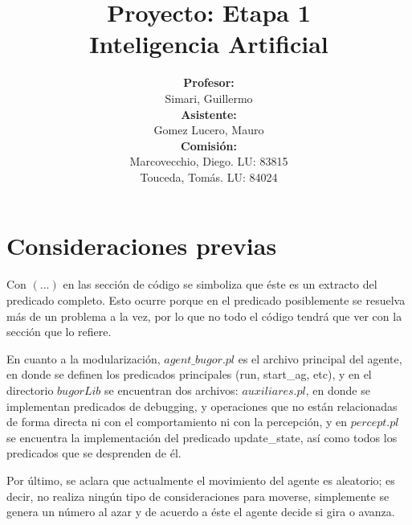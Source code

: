 \documentclass[a4paper,10pt,spanish]{article}
\begin{document}
\begin{titlepage}

\title{{\bf Proyecto: Etapa 1}\\ Inteligencia Artificial\vspace{10mm}}
\author{{\bf Profesor:}\\ Simari, Guillermo\\
{\bf Asistente:}\\ Gomez Lucero, Mauro\\
{\bf Comisi\'on:}\\ Marcovecchio, Diego. LU: 83815\\ Touceda, Tom\'as. LU: 84024}
\date{}

\maketitle

\thispagestyle{empty}

\end{titlepage}

\newpage

\tableofcontents

\newpage

\section{Consideraciones previas}

	Con $(...)$ en las secci\'on de c\'odigo se simboliza que \'este es un extracto del predicado completo. Esto ocurre porque en el predicado posiblemente se resuelva m\'as de un problema a la vez, por lo que no todo el c\'odigo tendr\'a que ver con la secci\'on que lo refiere.
	
	En cuanto a la modularizaci\'on, $agent\_bugor.pl$ es el archivo principal del agente, en donde se definen los predicados principales (run, start\_ag, etc), y en el directorio $bugorLib$ se encuentran dos archivos: $auxiliares.pl$, en donde se implementan predicados de debugging, y operaciones que no est\'an relacionadas de forma directa ni con el comportamiento ni con la percepci\'on, y en $percept.pl$ se encuentra la implementaci\'on del predicado update\_state, as\'i como todos los predicados que se desprenden de \'el.

	Por \'ultimo, se aclara que actualmente el movimiento del agente es aleatorio; es decir, no realiza ning\'un tipo de consideraciones para moverse, simplemente se genera un n\'umero al azar y de acuerdo a \'este el agente decide si gira o avanza.
\end{document}
